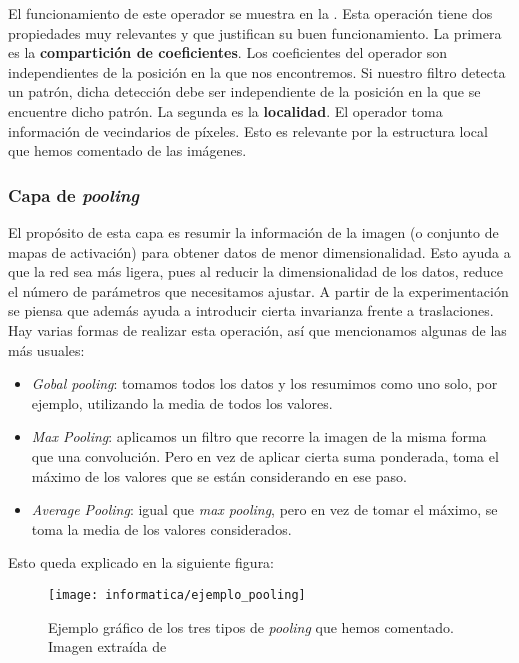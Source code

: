 El funcionamiento de este operador se muestra en la . Esta operación tiene dos propiedades muy relevantes y que justifican su buen funcionamiento. La primera es la \textbf{compartición de coeficientes}. Los coeficientes del operador son independientes de la posición en la que nos encontremos. Si nuestro filtro detecta un patrón, dicha detección debe ser independiente de la posición en la que se encuentre dicho patrón. La segunda es la \textbf{localidad}. El operador toma información de vecindarios de píxeles. Esto es relevante por la estructura local que hemos comentado de las imágenes.

\subsubsection{Capa de \textit{pooling}}

El propósito de esta capa es resumir la información de la imagen (o conjunto de mapas de activación) para obtener datos de menor dimensionalidad. Esto ayuda a que la red sea más ligera, pues al reducir la dimensionalidad de los datos, reduce el número de parámetros que necesitamos ajustar. A partir de la experimentación se piensa que además ayuda a introducir cierta invarianza frente a traslaciones. Hay varias formas de realizar esta operación, así que mencionamos algunas de las más usuales:

\begin{itemize}
	\item \textit{Gobal pooling}: tomamos todos los datos y los resumimos como uno solo, por ejemplo, utilizando la media de todos los valores.
	\item \textit{Max Pooling}: aplicamos un filtro que recorre la imagen de la misma forma que una convolución. Pero en vez de aplicar cierta suma ponderada, toma el máximo de los valores que se están considerando en ese paso.
	\item \textit{Average Pooling}: igual que \textit{max pooling}, pero en vez de tomar el máximo, se toma la media de los valores considerados.
\end{itemize}

Esto queda explicado en la siguiente figura:

\begin{figure}[H]
	\centering
	\texttt{[image: informatica/ejemplo\_pooling]}
	\caption{Ejemplo gráfico de los tres tipos de \textit{pooling} que hemos comentado. Imagen extraída de \cite{informatica:paper_definicion_cnn}}
\end{figure}

